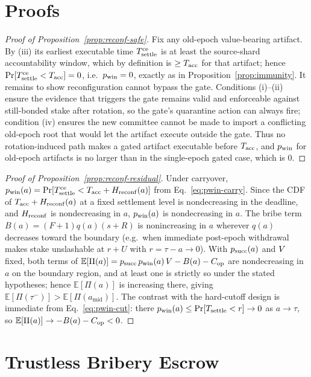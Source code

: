 \section{Proofs}
\label{app:proofs}

\begin{proof}[Proof of Proposition~\ref{prop:reconf-safe}]
Fix any old-epoch value-bearing artifact. By (iii) its earliest executable time $T_{\mathrm{settle}}^{\text{ce}}$
is at least the source-shard accountability window, which by definition is $\ge T_{\mathrm{acc}}$ for that
artifact; hence $\Pr[T_{\mathrm{settle}}^{\text{ce}}<T_{\mathrm{acc}}]=0$, i.e.\ $p_{\mathrm{win}}=0$, exactly as in
Proposition~\ref{prop:immunity}. It remains to show reconfiguration cannot bypass the gate.
Conditions (i)--(ii) ensure the evidence that triggers the gate remains valid and enforceable against
still-bonded stake after rotation, so the gate's quarantine action can always fire; condition (iv)
ensures the new committee cannot be made to import a conflicting old-epoch root that would let the
artifact execute outside the gate. Thus no rotation-induced path makes a gated artifact executable
before $T_{\mathrm{acc}}$, and $p_{\mathrm{win}}$ for old-epoch artifacts is no larger than in the single-epoch gated case,
which is $0$.
\end{proof}

\begin{proof}[Proof of Proposition~\ref{prop:reconf-residual}]
Under carryover, $p_{\mathrm{win}}(a)=\Pr[T_{\mathrm{settle}}^{\text{ce}}<T_{\mathrm{acc}}+H_{\mathrm{reconf}}(a)]$ from
Eq.~\eqref{eq:pwin-carry}. Since the CDF of $T_{\mathrm{acc}}+H_{\mathrm{reconf}}(a)$ at a fixed settlement level is
nondecreasing in the deadline, and $H_{\mathrm{reconf}}$ is nondecreasing in $a$, $p_{\mathrm{win}}(a)$ is nondecreasing in
$a$. The bribe term $B(a)=(F{+}1)q(a)(s{+}R)$ is nonincreasing in $a$ wherever $q(a)$ decreases toward
the boundary (e.g.\ when immediate post-epoch withdrawal makes stake unslashable at $r+U$ with
$r=\tau-a\to0$). With $p_{\mathrm{succ}}(a)$ and $V$ fixed, both terms of
$\mathbb{E}[\Pi(a)]=p_{\mathrm{succ}}\,p_{\mathrm{win}}(a)\,V-B(a)-C_{\mathrm{op}}$ are nondecreasing in $a$ on the boundary
region, and at least one is strictly so under the stated hypotheses; hence $\mathbb{E}[\Pi(a)]$ is
increasing there, giving $\mathbb{E}[\Pi(\tau^-)]>\mathbb{E}[\Pi(a_{\mathrm{mid}})]$. The contrast
with the hard-cutoff design is immediate from Eq.~\eqref{eq:pwin-cut}: there $p_{\mathrm{win}}(a)\le\Pr[T_{\mathrm{settle}}<r]\to0$
as $a\to\tau$, so $\mathbb{E}[\Pi(a)]\to-B(a)-C_{\mathrm{op}}<0$.
\end{proof}

\section{Trustless Bribery Escrow}
\label{app:contract}

